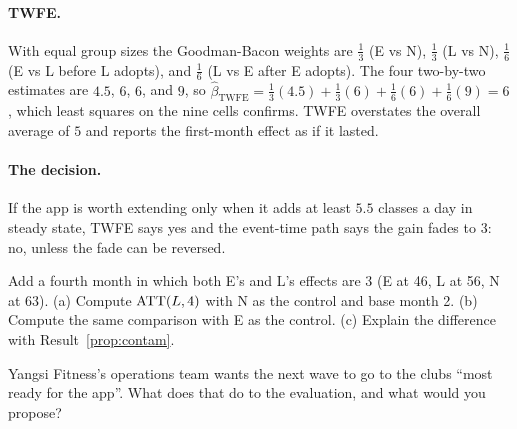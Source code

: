 \documentclass[11pt]{article}
\begin{document}
\paragraph{TWFE.} With equal group sizes the Goodman-Bacon weights are $\tfrac13$ (E vs N), $\tfrac13$ (L vs N), $\tfrac16$ (E vs L before L adopts), and $\tfrac16$ (L vs E after
E adopts). The four two-by-two estimates are $4.5$, $6$, $6$, and $9$, so
$\hat\beta_{\text{TWFE}} = \tfrac13(4.5) + \tfrac13(6) + \tfrac16(6) + \tfrac16(9) = 6$, which least squares on the nine cells confirms. TWFE overstates the overall average of
$5$ and reports the first-month effect as if it lasted.

\paragraph{The decision.} If the app is worth extending only when it adds at least $5.5$ classes a day in steady state, TWFE says yes and the event-time path
says the gain fades to $3$: no, unless the fade can be reversed.

\begin{exercise}[computation]
Add a fourth month in which both E's and L's effects are $3$ (E at 46, L at 56, N at 63). (a) Compute $\text{ATT}(L,4)$ with N as the control and base month 2.
(b) Compute the same comparison with E as the control. (c) Explain the difference with Result~\ref{prop:contam}.
\end{exercise}

\begin{exercise}[judgment]
Yangsi Fitness's operations team wants the next wave to go to the clubs ``most ready for the app''. What does that do to the evaluation, and what would you
propose?
\end{exercise}

\sectionthree
\end{document}
